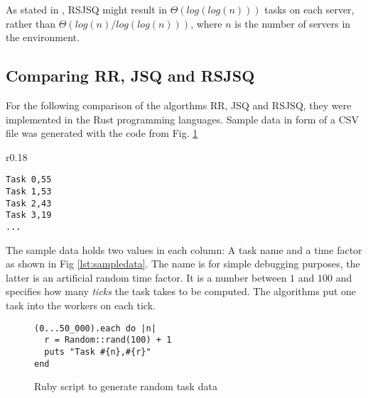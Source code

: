 As stated in \cite{powerOfTwoRandomChoices}, \ac{RSJSQ} might result in
$\Theta(log(log(n)))$ tasks on each server, rather than
$\Theta(log(n) / log(log(n)))$, where $n$ is the number of servers in the
environment.

\subsection{Comparing RR, \ac{JSQ} and \ac{RSJSQ}}

For the following comparison of the algorthms \ac{RR}, \ac{JSQ} and \ac{RSJSQ},
they were implemented in the Rust programming languages.
Sample data in form of a CSV file was generated with the code from
Fig. \ref{lst:ruby}

\begin{wrapfigure}{r}{0.18\textwidth}
	\begin{verbatim}
Task 0,55
Task 1,53
Task 2,43
Task 3,19
...
	\end{verbatim}
    \caption{Sample data}
    \label{lst:sampledata}
\end{wrapfigure}

The sample data holds two values in each column: A task name and a time factor as shown in
Fig \ref{lst:sampledata}.
The name is for simple debugging purposes, the latter is an artificial random
time factor.
It is a number between $1$ and $100$ and specifies how many \emph{ticks} the
task takes to be computed.
The algorithms put one task into the workers on each tick.

\begin{figure}[b!]
	\begin{verbatim}
(0...50_000).each do |n|
  r = Random::rand(100) + 1
  puts "Task #{n},#{r}"
end
	\end{verbatim}
    \caption{Ruby script to generate random task data}
    \label{lst:ruby}
\end{figure}

